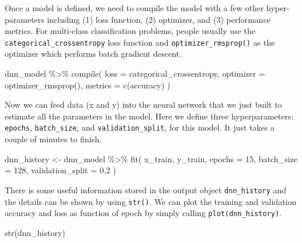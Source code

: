 \documentclass[
  12pt,
]{krantz}
\makeatletter
\newenvironment{Shaded}{\begin{snugshade}}{\end{snugshade}}
\newcommand{\AttributeTok}[1]{\textcolor[rgb]{0.61,0.61,0.61}{#1}}
\newcommand{\DecValTok}[1]{\textcolor[rgb]{0.06,0.06,0.06}{#1}}
\newcommand{\FloatTok}[1]{\textcolor[rgb]{0.06,0.06,0.06}{#1}}
\newcommand{\FunctionTok}[1]{\textcolor[rgb]{0,0,0}{#1}}
\newcommand{\NormalTok}[1]{#1}
\newcommand{\OtherTok}[1]{\textcolor[rgb]{0.37,0.37,0.37}{#1}}
\newcommand{\SpecialCharTok}[1]{\textcolor[rgb]{0,0,0}{#1}}
\newcommand{\StringTok}[1]{\textcolor[rgb]{0.5,0.5,0.5}{#1}}
\newenvironment{kframe}{%
\medskip{}
\setlength{\fboxsep}{.8em}
 \def\at@end@of@kframe{}%
 \ifinner\ifhmode%
  \def\at@end@of@kframe{\end{minipage}}%
  \begin{minipage}{\columnwidth}%
 \fi\fi%
 \def\FrameCommand##1{\hskip\@totalleftmargin \hskip-\fboxsep
 \colorbox{shadecolor}{##1}\hskip-\fboxsep
     \hskip-\linewidth \hskip-\@totalleftmargin \hskip\columnwidth}%
 \MakeFramed {\advance\hsize-\width
   \@totalleftmargin\z@ \linewidth\hsize
   \@setminipage}}%
 {\par\unskip\endMakeFramed%
 \at@end@of@kframe}
\renewenvironment{Shaded}{\begin{kframe}}{\end{kframe}}
\makeatother
\begin{document}
Once a model is defined, we need to compile the model with a few other hyper-parameters including (1) loss function, (2) optimizer, and (3) performance metrics. For multi-class classification problems, people usually use the \texttt{categorical\_crossentropy} loss function and \texttt{optimizer\_rmsprop()} as the optimizer which performs batch gradient descent.

\begin{Shaded}
\begin{Highlighting}[]
\NormalTok{dnn\_model }\SpecialCharTok{\%\textgreater{}\%} \FunctionTok{compile}\NormalTok{(}
  \AttributeTok{loss =} \StringTok{\textquotesingle{}categorical\_crossentropy\textquotesingle{}}\NormalTok{,}
  \AttributeTok{optimizer =} \FunctionTok{optimizer\_rmsprop}\NormalTok{(),}
  \AttributeTok{metrics =} \FunctionTok{c}\NormalTok{(}\StringTok{\textquotesingle{}accuracy\textquotesingle{}}\NormalTok{)}
\NormalTok{)}
\end{Highlighting}
\end{Shaded}

Now we can feed data (x and y) into the neural network that we just built to estimate all the parameters in the model. Here we define three hyperparameters: \texttt{epochs}, \texttt{batch\_size}, and \texttt{validation\_split}, for this model. It just takes a couple of minutes to finish.

\begin{Shaded}
\begin{Highlighting}[]
\NormalTok{dnn\_history }\OtherTok{\textless{}{-}}\NormalTok{ dnn\_model }\SpecialCharTok{\%\textgreater{}\%} \FunctionTok{fit}\NormalTok{(}
\NormalTok{  x\_train, y\_train,}
  \AttributeTok{epochs =} \DecValTok{15}\NormalTok{, }\AttributeTok{batch\_size =} \DecValTok{128}\NormalTok{,}
  \AttributeTok{validation\_split =} \FloatTok{0.2}
\NormalTok{)}
\end{Highlighting}
\end{Shaded}

There is some useful information stored in the output object \texttt{dnn\_history} and the details can be shown by using \texttt{str()}. We can plot the training and validation accuracy and loss as function of epoch by simply calling \texttt{plot(dnn\_history)}.

\begin{Shaded}
\begin{Highlighting}[]
\FunctionTok{str}\NormalTok{(dnn\_history)}
\end{Highlighting}
\end{Shaded}
\end{document}

